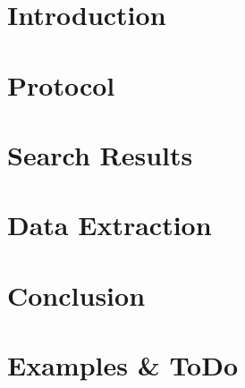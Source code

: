 



\frontmatter 

\cleardoublepage
%
%


\mainmatter



\chapter{Introduction}
\label{chap:intro}


\chapter{Protocol}
\label{chap:intro}


\chapter{Search Results}
\label{chap:intro}


\chapter{Data Extraction}
\label{chap:intro}


\chapter{Conclusion}
\label{chap:conclusion}

\appendix	%

%






%



\chapter{Examples \& ToDo}

\clearpage
\listoftodos
